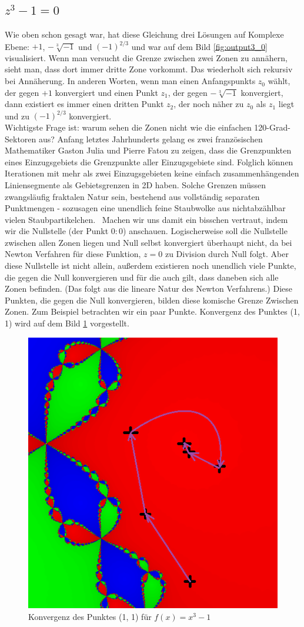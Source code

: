 \documentclass[a4paper,12pt]{llncs}
\numberwithin{equation}{section}
\begin{document}
\subsection{$z^3 - 1 = 0$}
Wie oben schon gesagt war, hat diese Gleichung drei Lösungen auf Komplexe Ebene: $+1$, $-\sqrt[3]{-1}$ und $(-1)^{2/3}$ und war auf dem Bild \ref{fig:output3_0} visualisiert. 
Wenn man versucht die Grenze zwischen zwei Zonen zu annähern, sieht man, dass dort immer dritte Zone vorkommt. 
Das wiederholt sich rekursiv bei Annäherung.
In anderen Worten, wenn man einen Anfangspunkts $z_0$ wählt, der gegen $+1$ konvergiert und einen Punkt $z_1$, der gegen  $-\sqrt[3]{-1}$ konvergiert, dann existiert es immer einen dritten Punkt $z_2$, der noch näher zu $z_0$ als $z_1$ liegt und zu $(-1)^{2/3}$ konvergiert. \\
Wichtigste Frage ist: warum sehen die Zonen nicht wie die einfachen 120-Grad-Sektoren aus?
Anfang letztes Jahrhunderts gelang es zwei französischen Mathematiker Gaston Julia und Pierre Fatou zu zeigen, dass die Grenzpunkten eines Einzugsgebiets die Grenzpunkte aller Einzugsgebiete sind. 
Folglich können Iterationen mit mehr als zwei Einzugsgebieten keine einfach zusammenhängenden Liniensegmente als Gebietsgrenzen in 2D haben. 
Solche Grenzen müssen zwangsläufig fraktalen Natur sein, bestehend aus vollständig separaten Punktmengen - sozusagen eine unendlich feine Staubwolke aus nichtabzählbar vielen Staubpartikelchen.~\cite{frak_cha}
Machen wir uns damit ein bisschen vertraut, indem wir die Nullstelle (der Punkt $0:0$) anschauen.
Logischerweise soll die Nullstelle zwischen allen Zonen liegen und Null selbst konvergiert überhaupt nicht, da bei Newton Verfahren für diese Funktion, $z=0$ zu Division durch Null folgt.
Aber diese Nullstelle ist nicht allein, außerdem existieren noch unendlich viele Punkte, die gegen die Null konvergieren und für die auch gilt, dass daneben sich alle Zonen befinden.
(Das folgt aus die lineare Natur des Newton Verfahrens.)
Diese Punkten, die gegen die Null konvergieren, bilden diese komische Grenze Zwischen Zonen. 
Zum Beispiel betrachten wir ein paar Punkte. 
Konvergenz des Punktes (1, 1) wird auf dem Bild \ref{fig:output_points3} vorgestellt.
\begin{figure}[ht]   
	\centering
	\includegraphics[width=.5\linewidth]{figures/output_points3}
	\caption{Konvergenz des Punktes (1, 1) für $f(x)=x^3-1$ }
	\label{fig:output_points3}
\end{figure}
\end{document}
